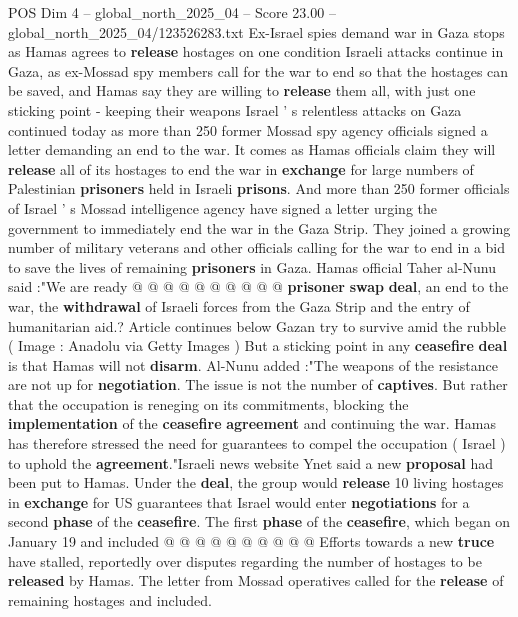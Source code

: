 \begin{textsample}{POS Dim 4 – global\_north\_2025\_04 – Score 23.00 – global\_north\_2025\_04/123526283.txt}  \label{ex:f4_pos_217}
Ex-Israel spies demand war in Gaza stops as Hamas agrees to \textbf{release} hostages on one condition Israeli attacks continue in Gaza, as ex-Mossad spy members call for the war to end so that the hostages can be saved, and Hamas say they are willing to \textbf{release} them all, with just one sticking point - keeping their weapons Israel ' s relentless attacks on Gaza continued today as more than 250 former Mossad spy agency officials signed a letter demanding an end to the war.
It comes as Hamas officials claim they will \textbf{release} all of its hostages to end the war in \textbf{exchange} for large numbers of Palestinian \textbf{prisoners} held in Israeli \textbf{prisons}.
And more than 250 former officials of Israel ' s Mossad intelligence agency have signed a letter urging the government to immediately end the war in the Gaza Strip.
They joined a growing number of military veterans and other officials calling for the war to end in a bid to save the lives of remaining \textbf{prisoners} in Gaza.
Hamas official Taher al-Nunu said :"We are ready @ @ @ @ @ @ @ @ @ @ \textbf{prisoner} \textbf{swap} \textbf{deal}, an end to the war, the \textbf{withdrawal} of Israeli forces from the Gaza Strip and the entry of humanitarian aid.?
Article continues below Gazan try to survive amid the rubble ( Image : Anadolu via Getty Images ) But a sticking point in any \textbf{ceasefire} \textbf{deal} is that Hamas will not \textbf{disarm}.
Al-Nunu added :"The weapons of the resistance are not up for \textbf{negotiation}.
The issue is not the number of \textbf{captives}.
But rather that the occupation is reneging on its commitments, blocking the \textbf{implementation} of the \textbf{ceasefire} \textbf{agreement} and continuing the war.
Hamas has therefore stressed the need for guarantees to compel the occupation ( Israel ) to uphold the \textbf{agreement}."Israeli news website Ynet said a new \textbf{proposal} had been put to Hamas.
Under the \textbf{deal}, the group would \textbf{release} 10 living hostages in \textbf{exchange} for US guarantees that Israel would enter \textbf{negotiations} for a second \textbf{phase} of the \textbf{ceasefire}.
The first \textbf{phase} of the \textbf{ceasefire}, which began on January 19 and included @ @ @ @ @ @ @ @ @ @ Efforts towards a new \textbf{truce} have stalled, reportedly over disputes regarding the number of hostages to be \textbf{released} by Hamas.
The letter from Mossad operatives called for the \textbf{release} of remaining hostages and included.

\end{textsample}
